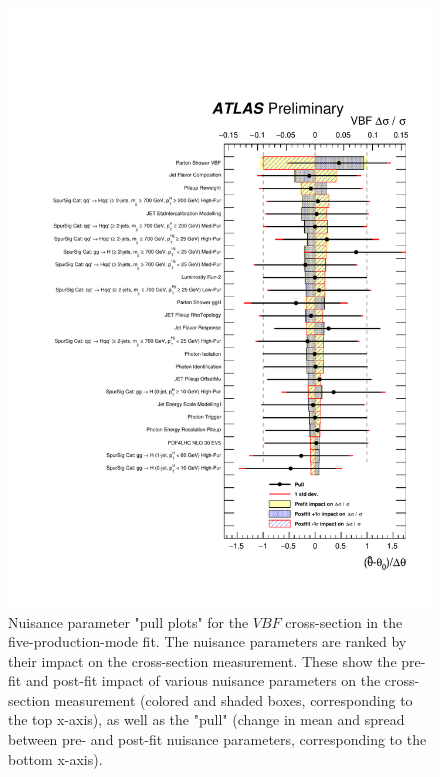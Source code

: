 \begin{figure}[htbp]
  \centering
  \includegraphics[width=0.9\linewidth]{figures/couplings_chapter/pulls_mu_VBF}
  \caption{Nuisance parameter "pull plots" for the $VBF$ cross-section in the five-production-mode fit. The nuisance parameters are ranked by their impact on the cross-section measurement. These show the pre-fit and post-fit impact of various nuisance parameters on the cross-section measurement (colored and shaded boxes, corresponding to the top x-axis), as well as the "pull" (change in mean and spread between pre- and post-fit nuisance parameters, corresponding to the bottom x-axis).}
  \label{fig:ranking_VBF}
\end{figure}

